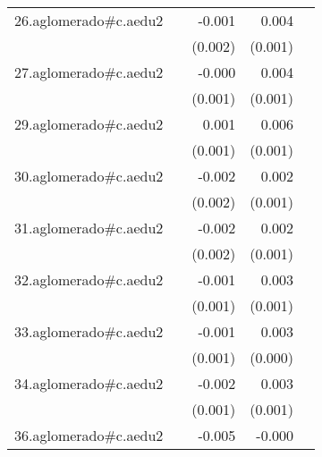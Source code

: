 {\begin{longtable}{l*{4}{D{.}{.}{-1}}}
\addlinespace
26.aglomerado#c.aedu2&                     &      -0.001         &       0.004\sym{**} &                     \\
            &                     &     (0.002)         &     (0.001)         &                     \\
\addlinespace
27.aglomerado#c.aedu2&                     &      -0.000         &       0.004\sym{***}&                     \\
            &                     &     (0.001)         &     (0.001)         &                     \\
\addlinespace
29.aglomerado#c.aedu2&                     &       0.001         &       0.006\sym{***}&                     \\
            &                     &     (0.001)         &     (0.001)         &                     \\
\addlinespace
30.aglomerado#c.aedu2&                     &      -0.002         &       0.002         &                     \\
            &                     &     (0.002)         &     (0.001)         &                     \\
\addlinespace
31.aglomerado#c.aedu2&                     &      -0.002         &       0.002         &                     \\
            &                     &     (0.002)         &     (0.001)         &                     \\
\addlinespace
32.aglomerado#c.aedu2&                     &      -0.001         &       0.003\sym{***}&                     \\
            &                     &     (0.001)         &     (0.001)         &                     \\
\addlinespace
33.aglomerado#c.aedu2&                     &      -0.001         &       0.003\sym{***}&                     \\
            &                     &     (0.001)         &     (0.000)         &                     \\
\addlinespace
34.aglomerado#c.aedu2&                     &      -0.002         &       0.003\sym{**} &                     \\
            &                     &     (0.001)         &     (0.001)         &                     \\
\addlinespace
36.aglomerado#c.aedu2&                     &      -0.005\sym{**} &      -0.000         &                     \\

\end{longtable}}
